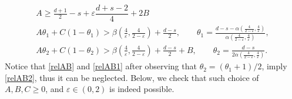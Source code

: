 \documentclass[10pt,leqno]{amsart}
\numberwithin{equation}{section}
\begin{document}
\begin{gather}
\label{relAB}
A\geq \frac{d+1}{2} -s +\varepsilon \dfrac{d+s-2}{4} +2B  \\
\label{relAB1}
A\theta_1 +C (1-\theta_1)>\beta \left( \frac{4}{\varepsilon}, \frac{4}{2-\varepsilon}\right)+\frac{d-s}{2},\qquad \theta_1=\frac{d-s - \alpha (\frac{4}{2-\varepsilon},\frac{4}{\varepsilon})}{\alpha (\frac{4}{2-\varepsilon} ,\frac{4}{\varepsilon})}, \\
\label{relAB2}
A\theta_2 +C(1-\theta_2 )> \beta \left(\frac{4}{\varepsilon}, \frac{4}{2-\varepsilon}\right) +\frac{d-s}{2} +B,\qquad \theta_2= \frac{d-s}{2\alpha  (\frac{4}{2-\varepsilon} ,\frac{4}{\varepsilon}) }. 
\end{gather}
Notice that \eqref{relAB} and \eqref{relAB1} after observing that $\theta_2 = (\theta_1 + 1)/2$, imply  \eqref{relAB2}, thus it can be neglected. 
Below, we check that such choice of $A, B, C \geq 0$, and $\varepsilon \in (0, 2)$ is indeed possible.
\end{document}
